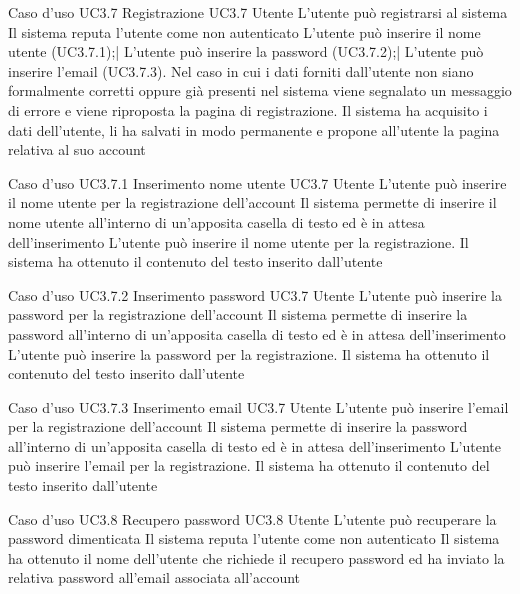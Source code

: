 \UCtitle
{Caso d'uso UC3.7}
{Registrazione}
\UC
{UC3.7}
{Utente}
{L'utente può registrarsi al sistema}
{Il sistema reputa l'utente come non autenticato}
\scenario
{L'utente può inserire il nome utente (UC3.7.1);|
L'utente può inserire la password (UC3.7.2);|
L'utente può inserire l'email (UC3.7.3).
}
\scenarioAlt
{Nel caso in cui i dati forniti dall'utente non siano formalmente corretti oppure già presenti nel sistema viene segnalato un messaggio di errore e viene riproposta la pagina di registrazione.
}
\post
{Il sistema ha acquisito i dati dell'utente, li ha salvati in modo permanente e propone all'utente la pagina relativa al suo account}

\UCtitle
{Caso d'uso UC3.7.1}
{Inserimento nome utente}
\UC
{UC3.7}
{Utente}
{L'utente può inserire il nome utente per la registrazione dell'account}
{Il sistema permette di inserire il nome utente all'interno di un'apposita casella di testo ed è in attesa dell'inserimento}
\scenario
{L'utente può inserire il nome utente per la registrazione.}
\post
{Il sistema ha ottenuto il contenuto del testo inserito dall'utente}

\UCtitle
{Caso d'uso UC3.7.2}
{Inserimento password}
\UC
{UC3.7}
{Utente}
{L'utente può inserire la password per la registrazione dell'account}
{Il sistema permette di inserire la password all'interno di un'apposita casella di testo ed è in attesa dell'inserimento}
\scenario
{L'utente può inserire la password per la registrazione.}
\post
{Il sistema ha ottenuto il contenuto del testo inserito dall'utente}

\UCtitle
{Caso d'uso UC3.7.3}
{Inserimento email}
\UC
{UC3.7}
{Utente}
{L'utente può inserire l'email per la registrazione dell'account}
{Il sistema permette di inserire la password all'interno di un'apposita casella di testo ed è in attesa dell'inserimento}
\scenario
{L'utente può inserire l'email per la registrazione.}
\post
{Il sistema ha ottenuto il contenuto del testo inserito dall'utente}

\UCtitle
{Caso d'uso UC3.8}
{Recupero password}
\UC
{UC3.8}
{Utente}
{L'utente può recuperare la password dimenticata}
{Il sistema reputa l'utente come non autenticato}
\post
{Il sistema ha ottenuto il nome dell'utente che richiede il recupero password ed ha inviato la relativa password all'email associata all'account}
